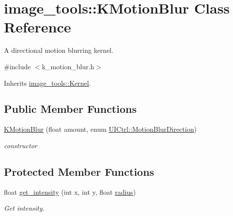 \hypertarget{classimage__tools_1_1KMotionBlur}{}\section{image\+\_\+tools\+:\+:K\+Motion\+Blur Class Reference}
\label{classimage__tools_1_1KMotionBlur}


A directional motion blurring kernel.  




{\ttfamily \#include $<$k\+\_\+motion\+\_\+blur.\+h$>$}



Inherits \hyperlink{classimage__tools_1_1Kernel}{image\+\_\+tools\+::\+Kernel}.

\subsection*{Public Member Functions}
\begin{DoxyCompactItemize}
\item 
\hyperlink{classimage__tools_1_1KMotionBlur_a75b9862095f6df793defe84f13b339cb}{K\+Motion\+Blur} (float amount, enum \hyperlink{classimage__tools_1_1UICtrl_a56d4f68bf91302769d7bc453d8d57cee}{U\+I\+Ctrl\+::\+Motion\+Blur\+Direction})\hypertarget{classimage__tools_1_1KMotionBlur_a75b9862095f6df793defe84f13b339cb}{}\label{classimage__tools_1_1KMotionBlur_a75b9862095f6df793defe84f13b339cb}

\begin{DoxyCompactList}\small\item\em constructor \end{DoxyCompactList}\end{DoxyCompactItemize}
\subsection*{Protected Member Functions}
\begin{DoxyCompactItemize}
\item 
float \hyperlink{classimage__tools_1_1KMotionBlur_a1a453c33891327ff252ea69ea0478ba7}{get\+\_\+intensity} (int x, int y, float \hyperlink{classimage__tools_1_1Kernel_ac834d16a242dd4a15f5f5e4a6dacea01}{radius})\hypertarget{classimage__tools_1_1KMotionBlur_a1a453c33891327ff252ea69ea0478ba7}{}\label{classimage__tools_1_1KMotionBlur_a1a453c33891327ff252ea69ea0478ba7}

\begin{DoxyCompactList}\small\item\em Get intensity. \end{DoxyCompactList}\end{DoxyCompactItemize}

